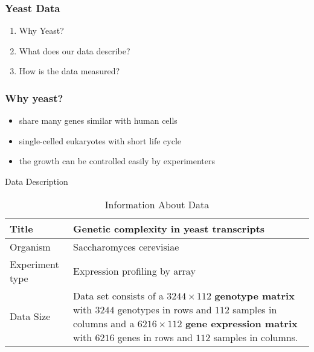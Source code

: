 \begin{frame}\frametitle{Yeast Data}
    \begin{enumerate}
        \item Why Yeast?
        \item What does our data describe?
        \item How is the data measured? 
    \end{enumerate}
\end{frame}

\begin{frame}\frametitle{Why yeast?}
    \begin{itemize}
\item share many genes similar with human cells        
        \item single-celled eukaryotes with short life cycle
        \item the growth can be controlled easily by experimenters
        
    \end{itemize}
\end{frame}

\begin{frame}{Data Description}
\begin{table}[h]
        \centering
        \begin{tabular}{|l|p{7cm}|}
            \hline
            Title                           &   Genetic complexity in yeast transcripts \\ \hline
            Organism                        &   Saccharomyces cerevisiae                \\ \hline
            Experiment type                 &   Expression profiling by array           \\ \hline
            \multirow{4}{*}{Data Size}      &   Data set consists of a $3244\times112$ \textbf{genotype matrix} with $3244$ genotypes in rows and $112$ samples in columns and a $6216\times112$ \textbf{gene expression matrix} with $6216$ genes in rows and $112$ samples in columns.  \\ \hline
        \end{tabular}
        \caption{Information About Data}
    \end{table}
\end{frame}


